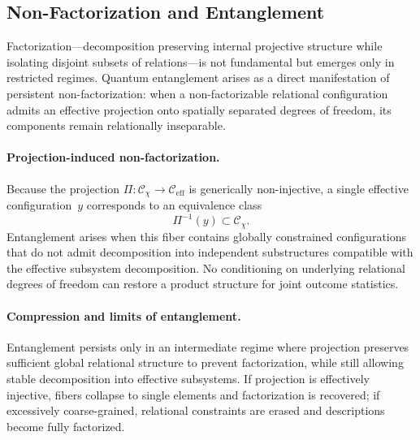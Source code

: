 \subsection{Non-Factorization and Entanglement}
  \label{subsec:non-factorization-entanglement}

  Factorization---decomposition preserving internal projective structure
  while isolating disjoint subsets of relations---is not fundamental but
  emerges only in restricted regimes.
  Quantum entanglement arises as a direct manifestation of persistent
  non-factorization: when a non-factorizable relational configuration
  admits an effective projection onto spatially separated degrees of
  freedom, its components remain relationally inseparable.

  \paragraph{Projection-induced non-factorization.}
    Because the projection
    $\Pi:\mathcal{C}_\chi \rightarrow \mathcal{C}_{\mathrm{eff}}$ is
    generically non-injective, a single effective configuration~$y$
    corresponds to an equivalence class
    \begin{equation}
      \Pi^{-1}(y) \subset \mathcal{C}_\chi .
    \end{equation}
    Entanglement arises when this fiber contains globally constrained
    configurations that do not admit decomposition into independent
    substructures compatible with the effective subsystem decomposition.
    No conditioning on underlying relational degrees of freedom can restore
    a product structure for joint outcome statistics.

  \paragraph{Compression and limits of entanglement.}
    Entanglement persists only in an intermediate regime where projection
    preserves sufficient global relational structure to prevent
    factorization, while still allowing stable decomposition into effective
    subsystems.
    If projection is effectively injective, fibers collapse to single
    elements and factorization is recovered; if excessively
    coarse-grained, relational constraints are erased and descriptions
    become fully factorized.
